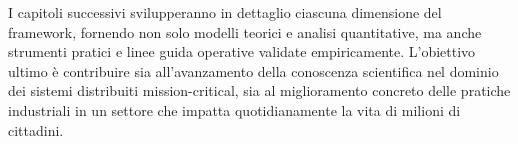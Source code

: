 I capitoli successivi svilupperanno in dettaglio ciascuna dimensione del framework, fornendo non solo modelli teorici e analisi quantitative, ma anche strumenti pratici e linee guida operative validate empiricamente. L'obiettivo ultimo è contribuire sia all'avanzamento della conoscenza scientifica nel dominio dei sistemi distribuiti mission-critical, sia al miglioramento concreto delle pratiche industriali in un settore che impatta quotidianamente la vita di milioni di cittadini.

\clearpage
\printbibliography[
    heading=subbibliography,
    title={Riferimenti Bibliografici del Capitolo 1},
]

\endrefsection